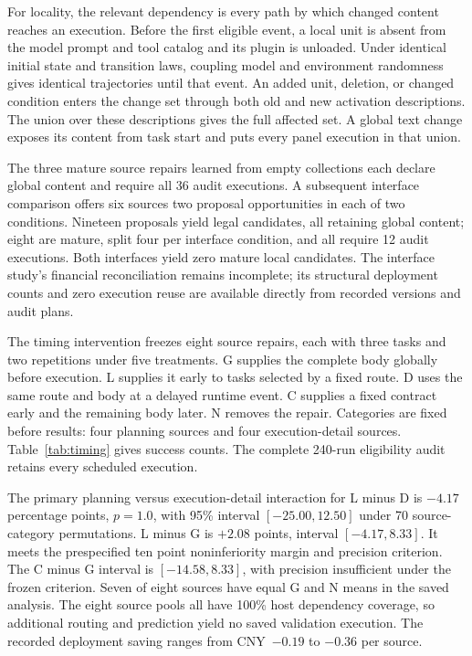 For locality, the relevant dependency is every path by which changed content reaches an execution. Before the first eligible event, a local unit is absent from the model prompt and tool catalog and its plugin is unloaded. Under identical initial state and transition laws, coupling model and environment randomness gives identical trajectories until that event. An added unit, deletion, or changed condition enters the change set through both old and new activation descriptions. The union over these descriptions gives the full affected set. A global text change exposes its content from task start and puts every panel execution in that union.

The three mature source repairs learned from empty collections each declare global content and require all 36 audit executions. A subsequent interface comparison offers six sources two proposal opportunities in each of two conditions. Nineteen proposals yield legal candidates, all retaining global content; eight are mature, split four per interface condition, and all require 12 audit executions. Both interfaces yield zero mature local candidates. The interface study's financial reconciliation remains incomplete; its structural deployment counts and zero execution reuse are available directly from recorded versions and audit plans.

The timing intervention freezes eight source repairs, each with three tasks and two repetitions under five treatments. G supplies the complete body globally before execution. L supplies it early to tasks selected by a fixed route. D uses the same route and body at a delayed runtime event. C supplies a fixed contract early and the remaining body later. N removes the repair. Categories are fixed before results: four planning sources and four execution-detail sources. Table~\ref{tab:timing} gives success counts. The complete 240-run eligibility audit retains every scheduled execution.

The primary planning versus execution-detail interaction for L minus D is $-4.17$ percentage points, $p=1.0$, with 95\% interval $[-25.00,12.50]$ under 70 source-category permutations. L minus G is $+2.08$ points, interval $[-4.17,8.33]$. It meets the prespecified ten point noninferiority margin and precision criterion. The C minus G interval is $[-14.58,8.33]$, with precision insufficient under the frozen criterion. Seven of eight sources have equal G and N means in the saved analysis. The eight source pools all have 100\% host dependency coverage, so additional routing and prediction yield no saved validation execution. The recorded deployment saving ranges from CNY~$-0.19$ to $-0.36$ per source.

